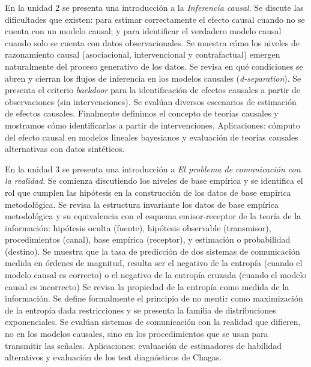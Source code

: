 \documentclass[a4paper,11pt]{book}
\theoremstyle{definition}
\begin{document}

En la unidad 2 se presenta una introducci\'on a la \emph{Inferencia causal}.
%
Se discute las dificultades que existen: para estimar correctamente el efecto causal cuando no se cuenta con un modelo causal; y para identificar el verdadero modelo causal cuando solo se cuenta con datos observacionales.
%
Se muestra c\'omo los niveles de razonamiento causal (asociacional, intervencional y contrafactual) emergen naturalmente del proceso generativo de los datos.
%
Se revisa en qu\'e condiciones se abren y cierran los flujos de inferencia en los modelos causales (\emph{d-separation}).
%
Se presenta el criterio \emph{backdoor} para la identificaci\'on de efectos causales a partir de observaciones (sin intervenciones).
%
Se eval\'uan diversos escenarios de estimaci\'on de efectos causales.
%
Finalmente definimos el concepto de teor\'ias causales y mostramos c\'omo identificarlas a partir de intervenciones.
%
Aplicaciones: c\'omputo del efecto causal en modelos lineales bayesianos y evaluaci\'on de teor\'ias causales alternativas con datos sint\'eticos.


En la unidad 3 se presenta una introducci\'on a \emph{El problema de comunicaci\'on con la realidad}.
%
Se comienza discutiendo los niveles de base emp\'irica y se identifica el rol que cumplen las hip\'otesis en la construcci\'on de los datos de base emp\'irica metodol\'ogica.
%
Se revisa la estructura invariante los datos de base emp\'irica metodol\'ogica y su equivalencia con el esquema emisor-receptor de la teor\'ia de la informaci\'on: hip\'otesis oculta (fuente), hip\'otesis observable (transmisor), procedimientos (canal), base emp\'irica (receptor), y estimaci\'on o probabilidad (destino).
%
Se muestra que la tasa de predicci\'on de dos sistemas de comunicaci\'on medida en \'ordenes de magnitud, resulta ser el negativo de la entrop\'ia (cuando el modelo causal es correcto) o el negativo de la entrop\'ia cruzada (cuando el modelo causal es incorrecto)
%
Se revisa la propiedad de la entrop\'ia como medida de la informaci\'on.
%
Se define formalmente el principio de no mentir como maximizaci\'on de la entrop\'ia dada restricciones y se presenta la familia de distribuciones exponenciales.
%
Se eval\'uan sistemas de comunicaci\'on con la realidad que difieren, no en los modelos causales, sino en los procedimientos que se usan para transmitir las se\~nales.
%
Aplicaciones: evaluaci\'on de estimadores de habilidad alterativos y evaluaci\'on de los test diagn\'osticos de Chagas.
\end{document}
